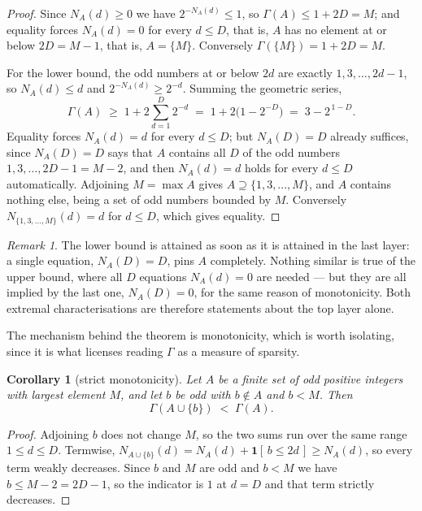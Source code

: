 \documentclass[11pt,a4paper]{article}
\theoremstyle{plain}
\newtheorem{corollary}[theorem]{Corollary}
\theoremstyle{definition}
\theoremstyle{remark}
\newtheorem{remark}[theorem]{Remark}
\begin{document}
\begin{proof}
Since $N_A(d)\ge0$ we have $2^{-N_A(d)}\le1$, so
$\Gamma(A)\le1+2D=M$; and equality forces $N_A(d)=0$ for every $d\le D$, that
is, $A$ has no element at or below $2D=M-1$, that is, $A=\{M\}$. Conversely
$\Gamma(\{M\})=1+2D=M$.

For the lower bound, the odd numbers at or below $2d$ are exactly
$1,3,\dots,2d-1$, so $N_A(d)\le d$ and $2^{-N_A(d)}\ge2^{-d}$. Summing the
geometric series,
\[
  \Gamma(A)\;\ge\;1+2\sum_{d=1}^{D}2^{-d}\;=\;1+2\bigl(1-2^{-D}\bigr)\;=\;3-2^{\,1-D}.
\]
Equality forces $N_A(d)=d$ for every $d\le D$; but $N_A(D)=D$ already suffices,
since $N_A(D)=D$ says that $A$ contains all $D$ of the odd numbers
$1,3,\dots,2D-1=M-2$, and then $N_A(d)=d$ holds for every $d\le D$
automatically. Adjoining $M=\max A$ gives $A\supseteq\{1,3,\dots,M\}$, and $A$
contains nothing else, being a set of odd numbers bounded by $M$. Conversely
$N_{\{1,3,\dots,M\}}(d)=d$ for $d\le D$, which gives equality.
\end{proof}

\begin{remark}
The lower bound is attained as soon as it is attained in the last layer: a
single equation, $N_A(D)=D$, pins $A$ completely. Nothing similar is true of
the upper bound, where all $D$ equations $N_A(d)=0$ are needed --- but they are
all implied by the last one, $N_A(D)=0$, for the same reason of monotonicity.
Both extremal characterisations are therefore statements about the top layer
alone.
\end{remark}

The mechanism behind the theorem is monotonicity, which is worth isolating,
since it is what licenses reading $\Gamma$ as a measure of sparsity.

\begin{corollary}[strict monotonicity]\label{cor:monotone}
Let $A$ be a finite set of odd positive integers with largest element $M$, and
let $b$ be odd with $b\notin A$ and $b<M$. Then
\[
  \Gamma(A\cup\{b\})\;<\;\Gamma(A).
\]
\end{corollary}

\begin{proof}
Adjoining $b$ does not change $M$, so the two sums run over the same range
$1\le d\le D$. Termwise,
$N_{A\cup\{b\}}(d)=N_A(d)+\mathbf 1[\,b\le2d\,]\ge N_A(d)$, so every term
weakly decreases. Since $b$ and $M$ are odd and $b<M$ we have $b\le M-2=2D-1$,
so the indicator is $1$ at $d=D$ and that term strictly decreases.
\end{proof}
\end{document}
